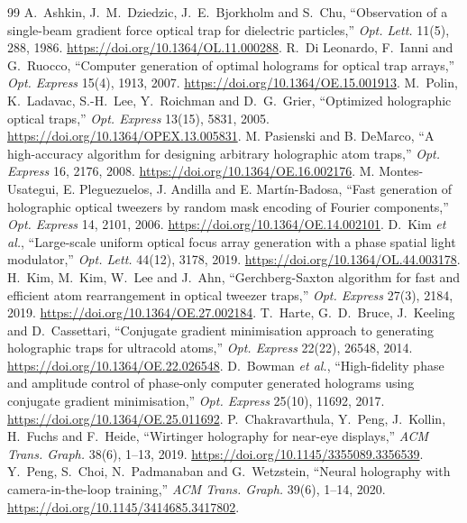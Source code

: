 \begin{thebibliography}{99}\small
{} A.~Ashkin, J.~M.~Dziedzic, J.~E.~Bjorkholm and S.~Chu, ``Observation of a single-beam gradient force optical trap for dielectric particles,'' \emph{Opt. Lett.} 11(5), 288, 1986. \url{https://doi.org/10.1364/OL.11.000288}.
 R.~Di Leonardo, F.~Ianni and G.~Ruocco, ``Computer generation of optimal holograms for optical trap arrays,'' \emph{Opt. Express} 15(4), 1913, 2007. \url{https://doi.org/10.1364/OE.15.001913}.
 M.~Polin, K.~Ladavac, S.-H.~Lee, Y.~Roichman and D.~G.~Grier, ``Optimized holographic optical traps,'' \emph{Opt. Express} 13(15), 5831, 2005. \url{https://doi.org/10.1364/OPEX.13.005831}.
 M. Pasienski and B. DeMarco, ``A high-accuracy algorithm for designing arbitrary holographic atom traps,'' \emph{Opt. Express} 16, 2176, 2008. \url{https://doi.org/10.1364/OE.16.002176}.
 M. Montes-Usategui, E. Pleguezuelos, J. Andilla and E. Mart\'in-Badosa, ``Fast generation of holographic optical tweezers by random mask encoding of Fourier components,'' \emph{Opt. Express} 14, 2101, 2006. \url{https://doi.org/10.1364/OE.14.002101}.
 D.~Kim \emph{et al.}, ``Large-scale uniform optical focus array generation with a phase spatial light modulator,'' \emph{Opt. Lett.} 44(12), 3178, 2019. \url{https://doi.org/10.1364/OL.44.003178}.
 H.~Kim, M.~Kim, W.~Lee and J.~Ahn, ``Gerchberg-Saxton algorithm for fast and efficient atom rearrangement in optical tweezer traps,'' \emph{Opt. Express} 27(3), 2184, 2019. \url{https://doi.org/10.1364/OE.27.002184}.
 T.~Harte, G.~D.~Bruce, J.~Keeling and D.~Cassettari, ``Conjugate gradient minimisation approach to generating holographic traps for ultracold atoms,'' \emph{Opt. Express} 22(22), 26548, 2014. \url{https://doi.org/10.1364/OE.22.026548}.
 D.~Bowman \emph{et al.}, ``High-fidelity phase and amplitude control of phase-only computer generated holograms using conjugate gradient minimisation,'' \emph{Opt. Express} 25(10), 11692, 2017. \url{https://doi.org/10.1364/OE.25.011692}.
 P.~Chakravarthula, Y.~Peng, J.~Kollin, H.~Fuchs and F.~Heide, ``Wirtinger holography for near-eye displays,'' \emph{ACM Trans. Graph.} 38(6), 1--13, 2019. \url{https://doi.org/10.1145/3355089.3356539}.
 Y.~Peng, S.~Choi, N.~Padmanaban and G.~Wetzstein, ``Neural holography with camera-in-the-loop training,'' \emph{ACM Trans. Graph.} 39(6), 1--14, 2020. \url{https://doi.org/10.1145/3414685.3417802}.

\end{thebibliography}
